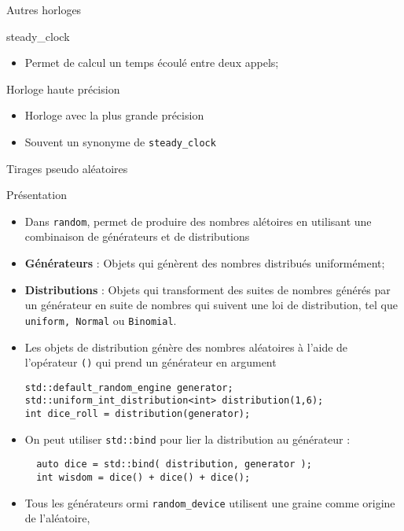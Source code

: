 \documentclass[handout,10pt]{beamer}
\newcommand{\includepartcode}[4][cpp]{

}
\begin{document}
\begin{frame}[fragile]{Autres horloges}
\tiny
\begin{block}{steady\_clock}
\begin{itemize}
 \item Permet de calcul un temps écoulé entre deux appels;
\end{itemize}

\end{block}
\includepartcode{steady_clock.cpp}{30}{35}
\begin{block}{Horloge haute précision}
 \begin{itemize}
  \item Horloge avec la plus grande précision
  \item Souvent un synonyme de \lstinline$steady_clock$
 \end{itemize}
\end{block}

\end{frame}

\begin{frame}[fragile]{Tirages pseudo aléatoires}
 \tiny
 
 \begin{block}{Présentation}
  \begin{itemize}
   \item Dans \lstinline$random$, permet de produire des nombres alétoires en utilisant une combinaison de générateurs et de distributions
   \item \textbf{Générateurs}   : Objets qui génèrent des nombres distribués uniformément;
   \item \textbf{Distributions} : Objets qui transforment des suites de nombres générés par un générateur en suite de nombres qui suivent une
   loi de distribution, tel que \lstinline$uniform, Normal$ ou \lstinline$Binomial$.
   \item Les objets de distribution génère des nombres aléatoires à l'aide de l'opérateur \lstinline$()$ qui prend un générateur en argument
\begin{lstlisting}
std::default_random_engine generator;
std::uniform_int_distribution<int> distribution(1,6);
int dice_roll = distribution(generator);
\end{lstlisting}
  \item On peut utiliser \lstinline$std::bind$ pour lier la distribution au générateur :
\begin{lstlisting}
  auto dice = std::bind( distribution, generator );
  int wisdom = dice() + dice() + dice();
\end{lstlisting}
\item Tous les générateurs ormi \lstinline$random_device$ utilisent une graine comme origine de l'aléatoire, 
  \end{itemize}
 \end{block}

\end{frame}
\end{document}
